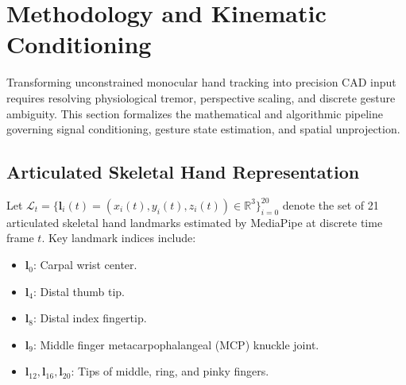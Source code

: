 \section{Methodology and Kinematic Conditioning}
\label{sec:methodology}

Transforming unconstrained monocular hand tracking into precision CAD input requires resolving physiological tremor, perspective scaling, and discrete gesture ambiguity. This section formalizes the mathematical and algorithmic pipeline governing signal conditioning, gesture state estimation, and spatial unprojection.

\subsection{Articulated Skeletal Hand Representation}
Let $\mathcal{L}_t = \{\mathbf{l}_i(t) = (x_i(t), y_i(t), z_i(t)) \in \mathbb{R}^3\}_{i=0}^{20}$ denote the set of 21 articulated skeletal hand landmarks estimated by MediaPipe at discrete time frame $t$. Key landmark indices include:
\begin{itemize}
    \item $\mathbf{l}_0$: Carpal wrist center.
    \item $\mathbf{l}_4$: Distal thumb tip.
    \item $\mathbf{l}_8$: Distal index fingertip.
    \item $\mathbf{l}_9$: Middle finger metacarpophalangeal (MCP) knuckle joint.
    \item $\mathbf{l}_{12}, \mathbf{l}_{16}, \mathbf{l}_{20}$: Tips of middle, ring, and pinky fingers.
\end{itemize}

